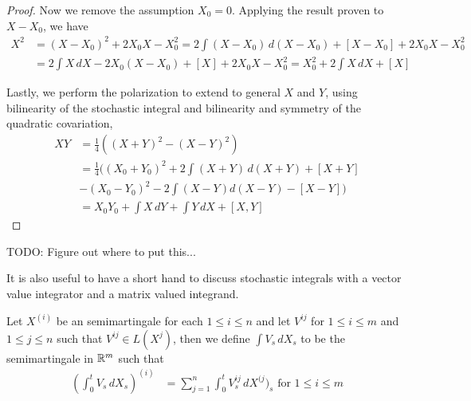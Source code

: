 \begin{proof}
Now we remove the assumption $X_0 = 0$.  Applying the result proven to $X - X_0$, we have
\begin{align*}
X^2 &= (X-X_0)^2 + 2X_0X - X_0^2 = 2 \int (X - X_0) \, d(X - X_0) + [X-X_0] + 2X_0 X - X_0^2 \\
&= 2 \int X \, dX - 2X_0 (X-X_0) + [X] + 2X_0 X - X_0^2 = X_0^2 + 2 \int X \, dX + [X]
\end{align*}

Lastly, we perform the polarization to extend to general $X$ and $Y$, using bilinearity of the stochastic integral and bilinearity and symmetry of the quadratic covariation,
\begin{align*}
XY &= \frac{1}{4} \left( (X + Y)^2 - (X-Y)^2 \right) \\
&=\frac{1}{4} \bigl( (X_0 + Y_0)^2 + 2\int (X+Y) \, d(X+Y) + [X+Y] \\
&- (X_0-Y_0)^2 - 2\int (X-Y) d(X-Y) - [X-Y] \bigr) \\
&=X_0 Y_0 + \int X \, dY + \int Y \, dX + [X,Y]
\end{align*}
\end{proof}

TODO: Figure out where to put this...

It is also useful to have a short hand to discuss stochastic integrals with a vector value integrator and a matrix valued integrand.
\begin{defn}Let $X^{(i)}$ be an semimartingale for each $1 \leq i \leq n$ and let $V^{ij}$ for $1 \leq i \leq m$ and $1 \leq j \leq n$ such that $V^{ij} \in L(X^j)$, then we define $\int V_s \, dX_s$ to be the semimartingale in $\mathbb{R}^m$ such that
\begin{align*}
\left( \int_0^t V_s \, dX_s \right)^{(i)} &= \sum_{j=1}^n \int_0^t V^{ij}_s \, dX^{(j})_s \text{ for $1 \leq i \leq m$}
\end{align*}
\end{defn}


